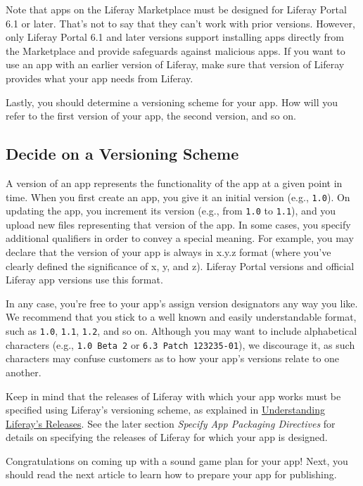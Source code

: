 Note that apps on the Liferay Marketplace must be designed for Liferay
Portal 6.1 or later. That's not to say that they can't work with prior
versions. However, only Liferay Portal 6.1 and later versions support
installing apps directly from the Marketplace and provide safeguards
against malicious apps. If you want to use an app with an earlier
version of Liferay, make sure that version of Liferay provides what your
app needs from Liferay.

Lastly, you should determine a versioning scheme for your app. How will
you refer to the first version of your app, the second version, and so
on.

\subsection{Decide on a Versioning
Scheme}\label{decide-on-a-versioning-scheme}

A version of an app represents the functionality of the app at a given
point in time. When you first create an app, you give it an initial
version (e.g., \texttt{1.0}). On updating the app, you increment its
version (e.g., from \texttt{1.0} to \texttt{1.1}), and you upload new
files representing that version of the app. In some cases, you specify
additional qualifiers in order to convey a special meaning. For example,
you may declare that the version of your app is always in x.y.z format
(where you've clearly defined the significance of x, y, and z). Liferay
Portal versions and official Liferay app versions use this format.

In any case, you're free to your app's assign version designators any
way you like. We recommend that you stick to a well known and easily
understandable format, such as \texttt{1.0}, \texttt{1.1}, \texttt{1.2},
and so on. Although you may want to include alphabetical characters
(e.g., \texttt{1.0\ Beta\ 2} or \texttt{6.3\ Patch\ 123235-01}), we
discourage it, as such characters may confuse customers as to how your
app's versions relate to one another.

Keep in mind that the releases of Liferay with which your app works must
be specified using Liferay's versioning scheme, as explained in
\href{/docs/6-2/deploy/-/knowledge_base/d/understanding-liferays-releases}{Understanding
Liferay's Releases}. See the later section \emph{Specify App Packaging
Directives} for details on specifying the releases of Liferay for which
your app is designed.

Congratulations on coming up with a sound game plan for your app! Next,
you should read the next article to learn how to prepare your app for
publishing.

